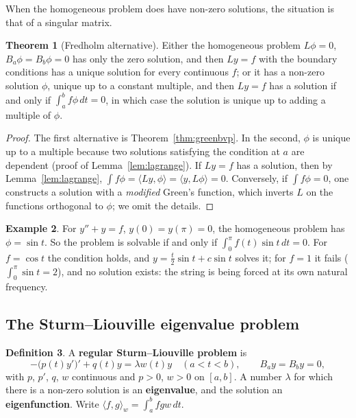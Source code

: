 \documentclass[11pt,a4paper]{article}
\numberwithin{equation}{section}
\theoremstyle{definition}
\newtheorem{thm}{Theorem}[subsection]
\newtheorem{defn}[thm]{Definition}
\newtheorem{exa}[thm]{Example}
\begin{document}
When the homogeneous problem does have non-zero solutions, the situation is that of a singular matrix.

\begin{thm}[Fredholm alternative]
\label{thm:fredholm}
Either the homogeneous problem $L\phi = 0$, $B_a\phi = B_b\phi = 0$ has only the zero solution, and then $Ly = f$ with the boundary conditions has a unique solution for every continuous $f$; or it has a
non-zero solution $\phi$, unique up to a constant multiple, and then $Ly = f$ has a solution if and only if $\int_a^bf\phi\,dt = 0$, in which case the solution is unique up to adding a multiple of $\phi$.
\end{thm}

\begin{proof}
The first alternative is Theorem~\ref{thm:greenbvp}. In the second, $\phi$ is unique up to a multiple because two solutions satisfying the condition at $a$ are dependent (proof of Lemma~\ref{lem:lagrange}). If
$Ly = f$ has a solution, then by Lemma~\ref{lem:lagrange}, $\int f\phi = \langle Ly, \phi\rangle = \langle y, L\phi\rangle = 0$. Conversely, if $\int f\phi = 0$, one constructs a solution with a \emph{modified} Green's function, which
inverts $L$ on the functions orthogonal to $\phi$; we omit the details.
\end{proof}

\begin{exa}
\label{ex:fredholm}
For $y'' + y = f$, $y(0) = y(\pi) = 0$, the homogeneous problem has $\phi = \sin t$. So the problem is solvable if and only if $\int_0^\pi f(t)\sin t\,dt = 0$. For $f = \cos t$ the condition holds, and
$y = \frac t2\sin t + c\sin t$ solves it; for $f = 1$ it fails ($\int_0^\pi\sin t = 2$), and no solution exists: the string is being forced at its own natural frequency.
\end{exa}

\subsection{The Sturm--Liouville eigenvalue problem}
\label{ssec:slproblem}

\begin{defn}
A \textbf{regular Sturm--Liouville problem} is
\[
-\bigl(p(t)y'\bigr)' + q(t)y = \lambda w(t)y \quad (a < t < b), \qquad B_ay = B_by = 0 ,
\]
with $p$, $p'$, $q$, $w$ continuous and $p > 0$, $w > 0$ on $[a, b]$. A number $\lambda$ for which there is a non-zero solution is an \textbf{eigenvalue}, and the solution an \textbf{eigenfunction}. Write
$\langle f, g\rangle_w = \int_a^bfgw\,dt$.
\end{defn}
\end{document}
